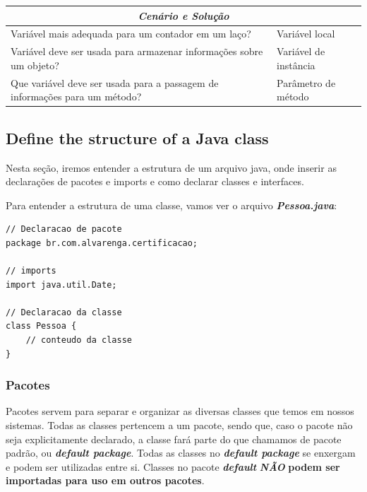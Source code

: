 \documentclass[12pt]{article}
\begin{document}
\begin{table}[H]
	\begin{tabular}{|ll|}
		\hline
		\multicolumn{2}{|c|}{\cellcolor[HTML]{34FF34}\textit{\textbf{Cenário e Solução}}}                                        \\ \hline
		\multicolumn{1}{|l|}{Variável mais adequada para um contador em um laço?}                        & Variável local        \\ \hline
		\multicolumn{1}{|l|}{Variável deve ser usada para armazenar informações sobre um objeto?}        & Variável de instância \\ \hline
		\multicolumn{1}{|l|}{Que variável deve ser usada para a passagem de informações para um método?} & Parâmetro de método   \\ \hline
	\end{tabular}
\end{table}

\subsection{Define the structure of a Java class}

Nesta seção, iremos entender a estrutura de um arquivo java, onde inserir as declarações de pacotes e imports e como declarar classes e interfaces.

Para entender a estrutura de uma classe, vamos ver o arquivo \textbf{\textit{Pessoa.java}}:

\begin{lstlisting}
// Declaracao de pacote
package br.com.alvarenga.certificacao;
	
// imports
import java.util.Date;
	
// Declaracao da classe
class Pessoa {
	// conteudo da classe
}
\end{lstlisting}

\subsubsection{Pacotes}

Pacotes servem para separar e organizar as diversas classes que temos em nossos sistemas. Todas as classes pertencem a um pacote, sendo que, caso o pacote não seja explicitamente declarado, a classe fará parte do que chamamos de pacote padrão, ou \textbf{\textit{default package}}. Todas as classes no \textbf{\textit{default package}} se enxergam e podem ser utilizadas entre si. Classes no pacote \textbf{\textit{default}} \textbf{\textit{NÃO}} \textbf{podem ser importadas para uso em outros pacotes}.
\end{document}
